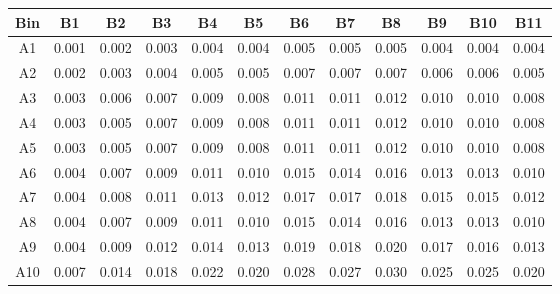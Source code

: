 \begin{tabular}{c@{~~~}c@{~~}c@{~~}c@{~~}c@{~~}c@{~~}c@{~~}c@{~~}c@{~~}c@{~~}c@{~~}c}
\hline
 \hline
Bin	& B1 & B2 & B3 & B4 & B5 & B6 & B7 & B8 & B9 & B10 & B11 \\
\hline
A1	&  0.001 &  0.002 &  0.003 &  0.004 &  0.004 &  0.005 &  0.005 &  0.005 &  0.004 &  0.004 &  0.004 \\
A2	&  0.002 &  0.003 &  0.004 &  0.005 &  0.005 &  0.007 &  0.007 &  0.007 &  0.006 &  0.006 &  0.005 \\
A3	&  0.003 &  0.006 &  0.007 &  0.009 &  0.008 &  0.011 &  0.011 &  0.012 &  0.010 &  0.010 &  0.008 \\
A4	&  0.003 &  0.005 &  0.007 &  0.009 &  0.008 &  0.011 &  0.011 &  0.012 &  0.010 &  0.010 &  0.008 \\
A5	&  0.003 &  0.005 &  0.007 &  0.009 &  0.008 &  0.011 &  0.011 &  0.012 &  0.010 &  0.010 &  0.008 \\
A6	&  0.004 &  0.007 &  0.009 &  0.011 &  0.010 &  0.015 &  0.014 &  0.016 &  0.013 &  0.013 &  0.010 \\
A7	&  0.004 &  0.008 &  0.011 &  0.013 &  0.012 &  0.017 &  0.017 &  0.018 &  0.015 &  0.015 &  0.012 \\
A8	&  0.004 &  0.007 &  0.009 &  0.011 &  0.010 &  0.015 &  0.014 &  0.016 &  0.013 &  0.013 &  0.010 \\
A9	&  0.004 &  0.009 &  0.012 &  0.014 &  0.013 &  0.019 &  0.018 &  0.020 &  0.017 &  0.016 &  0.013 \\
A10	&  0.007 &  0.014 &  0.018 &  0.022 &  0.020 &  0.028 &  0.027 &  0.030 &  0.025 &  0.025 &  0.020 \\
\hline
 \hline
\end{tabular}
